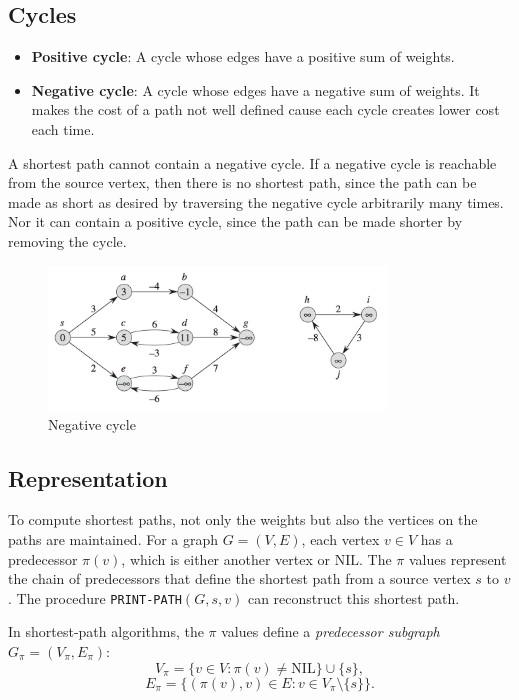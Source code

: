 \subsection*{Cycles}

\begin{itemize}
    \item \textbf{Positive cycle}: A cycle whose edges have a positive sum of weights.
    \item \textbf{Negative cycle}: A cycle whose edges have a negative sum of weights. It makes the cost of a path not well defined cause each cycle creates lower cost each time. 
\end{itemize}

A shortest path cannot contain a negative cycle. If a negative cycle is reachable from the source vertex, then there is no shortest path, since the path can be made as short as desired by traversing the negative cycle arbitrarily many times.
Nor it can contain a positive cycle, since the path can be made shorter by removing the cycle.

\begin{figure}[H]
    \centering
    \includegraphics[width=0.8\textwidth]{assets/neg_cycle.png}
    \caption{Negative cycle}
    \label{fig:negative_cycle}
\end{figure}

\subsection*{Representation}

To compute shortest paths, not only the weights but also the vertices on the paths are maintained. For a graph $G = (V, E)$, each vertex $v \in V$ has a predecessor $\pi(v)$, which is either another vertex or $\text{NIL}$. The $\pi$ values represent the chain of predecessors that define the shortest path from a source vertex $s$ to $v$. The procedure \texttt{PRINT-PATH}$(G, s, v)$ can reconstruct this shortest path.

In shortest-path algorithms, the $\pi$ values define a \textit{predecessor subgraph} $G_\pi = (V_\pi, E_\pi)$:
\[
V_\pi = \{v \in V : \pi(v) \neq \text{NIL}\} \cup \{s\},
\]
\[
E_\pi = \{(\pi(v), v) \in E : v \in V_\pi \setminus \{s\}\}.
\]

